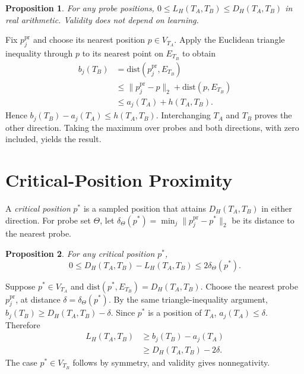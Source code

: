 \documentclass[10pt,conference,letterpaper]{IEEEtran}
\newtheorem{proposition}{Proposition}
\begin{document}
\begin{proposition}
For any probe positions,
$0\leq L_H(T_A,T_B)\leq D_H(T_A,T_B)$ in real arithmetic.
Validity does not depend on learning.
\end{proposition}

\begin{IEEEproof}
Fix $p_j^{\mathrm{pr}}$ and choose its nearest position $p\in V_{T_A}$.
Apply the Euclidean triangle inequality through $p$ to its nearest point on
$E_{T_B}$ to obtain
\begin{equation}
\begin{aligned}
b_j(T_B)&=\mathrm{dist}(p_j^{\mathrm{pr}},E_{T_B})\\
&\leq\lVert p_j^{\mathrm{pr}}-p\rVert_2+\mathrm{dist}(p,E_{T_B})\\
&\leq a_j(T_A)+h(T_A,T_B).
\end{aligned}
\end{equation}
Hence $b_j(T_B)-a_j(T_A)\leq h(T_A,T_B)$. Interchanging $T_A$ and $T_B$
proves the other direction. Taking the maximum over probes and both directions,
with zero included, yields the result.
\end{IEEEproof}

\section{Critical-Position Proximity}
\label{app:proximity}

A \emph{critical position} $p^*$ is a sampled position that attains
$D_H(T_A,T_B)$ in either direction. For probe set $\Theta$, let
$\delta_\Theta(p^*)=\min_j\lVert p_j^{\mathrm{pr}}-p^*\rVert_2$ be its
distance to the nearest probe.

\begin{proposition}
For any critical position $p^*$,
\begin{equation}
0\leq D_H(T_A,T_B)-L_H(T_A,T_B)\leq 2\delta_\Theta(p^*).
\end{equation}
\end{proposition}

\begin{IEEEproof}
Suppose $p^*\in V_{T_A}$ and
$\mathrm{dist}(p^*,E_{T_B})=D_H(T_A,T_B)$. Choose the nearest probe
$p_j^{\mathrm{pr}}$, at distance $\delta=\delta_\Theta(p^*)$.
By the same triangle-inequality argument,
$b_j(T_B)\geq D_H(T_A,T_B)-\delta$. Since $p^*$ is a position of $T_A$,
$a_j(T_A)\leq\delta$. Therefore
\begin{equation}
\begin{aligned}
L_H(T_A,T_B)&\geq b_j(T_B)-a_j(T_A)\\
&\geq D_H(T_A,T_B)-2\delta.
\end{aligned}
\end{equation}
The case $p^*\in V_{T_B}$ follows by symmetry, and validity gives nonnegativity.
\end{IEEEproof}
\end{document}
